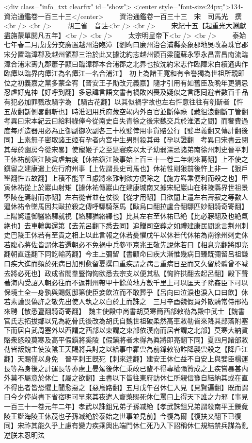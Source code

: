 <div class="info_txt clearfix" id="show">
<center style="font-size:24px;">134-資治通鑑卷一百三十三</center>
  　　資治通鑑卷一百三十三　宋　司馬光　撰<br />
<br />
　　胡三省　音註<br />
<br />
　　宋紀十五【起重光大淵獻盡旃蒙單閼凡五年】<br />
<br />
　　太宗明皇帝下<br />
<br />
　　泰始七年春二月戊戌分交廣置越州治臨漳【劉昫曰廉州治合浦縣秦象郡地吳改為珠官郡宋分置臨漳郡及越州領郡三治於此又據沈約志越州領百梁龍蘇永寧永昌富昌南流臨漳合浦宋夀九郡蕭子顯曰臨漳郡本合浦郡之北界也按沈約宋志作臨障宋白續通典作臨瘴以臨界内瘴江為名瘴江一名合浦江】　初上為諸王寛和有令譽獨為世祖所親即位之初義嘉之黨多蒙全宥【晉安王子勛改元義嘉】隨才引用有如舊臣及晩年更猜忌忍虐好鬼神【好呼到翻】多忌諱言語文書有禍敗凶喪及疑似之言應囘避者數百千品有犯必加罪戮改騧字為【騧古花翻】以其似禍字故也左右忤意往往有刳斮者【忤五故翻斮側畧翻斬也】時淮泗用兵府藏空竭内外百官並斷俸祿【藏徂浪翻斷丁管翻　考異曰宋本紀云曰給料祿俸今從南史自失青徐之後宋魏交兵於淮泗之間】而奢費過度每所造器用必為正御副御次副各三十枚嬖倖用事貨賂公行【嬖卑義翻又傳計翻後同】上素無子密取諸王姬有孕者内宫中生男則殺其母【孕以證翻　考異曰宋書云閉其母於幽房今從宋畧】使寵姬子之至是寢疾以太子幼弱深忌諸弟南徐州刺史晉平刺王休祐前鎭江陵貪虐無度【休祐鎭江陵事始上百三十一卷二年刺來葛翻】上不使之鎭留之建康遣上佐行府州事【上佐謂長史司馬也】休祐性剛狠前後忤上非一【狠戶墾翻忤五故翻】上積不能平且慮將來難制欲方便除之【施方畧乘便利而殺之也】甲寅休祐從上於巖山射雉【據休祐傳巖山在建康城南又據宋紀巖山在秣陵縣界世祖景寧陵在焉射而亦翻】左右從者並在仗後【從才用翻】日欲闇上遣左右壽寂之等數人逼休祐令墜馬因共敺拉殺之傳呼驃騎落馬【敺烏口翻拉盧合翻驃匹妙翻騎奇寄翻】上陽驚遣御醫絡驛就視【絡驛猶絡繹也】比其左右至休祐已絶【比必寐翻及也絶氣絶也】去車輪輿還第【去羌呂翻下悉去同】追贈司空葬之如禮建康民間訛言荆州刺史巴陵王休若有至貴之相上以此言報之休若憂懼戊午以休若代休祐為南徐州刺史休若腹心將佐皆謂休若還朝必不免禍中兵參軍京兆王敬先說休若曰【相息亮翻將即亮翻朝直遥翻下同訖輸芮翻】今主上彌留【書顧命曰疾大漸惟幾病日臻既彌留呂祖謙曰疾大進而頻於死病日加則愈留夏撰曰重疾謂之病言重病日至而又久留於體曾不减去將必死也】政成省閤羣豎恟恟欲悉去宗支以便其私【恟許拱翻去起呂翻】殿下聲著海内受詔入朝必往而不返荆州帶甲十餘萬地方數千里上可以匡天子除姦臣下可以保境土全一身孰與賜劒邸第使臣妾飲泣而不敢葬乎【呂向曰泣淚也淚入口曰飲】休若素謹畏偽許之敬先出使人執之以白於上而誅之　三月辛酉魏假員外散騎常侍邢祐來聘【散悉亶翻騎奇寄翻】　魏主使殿中尚書胡莫寒簡西部敕勒為殿中武士【魏書官氏志拓拔鄰以兄為紇骨氏後改為胡氏自魏世祖破柔然高車敕勒皆來降其部落附塞下而居自武周塞外以西謂之西部以東謂之東部依漠南而居者謂之北部】莫寒大納貨賂衆怒殺莫寒及高平假鎭將奚陵【假鎭將者未得為眞將即亮翻下同】夏四月諸部敕勒皆叛魏主使汝隂王天賜將兵討之以給事中羅雲為前鋒敕勒詐降襲雲殺之【降戶江翻】天賜僅以身免　晉平刺王旣死【刺來逹翻】建安王休仁益不自安上與嬖臣楊運長等為身後之計運長等亦慮上晏駕後休仁秉政已輩不得專權彌贊成之上疾嘗暴甚内外莫不屬意於休仁【屬之欲翻】主書以下皆往東府訪休仁所親信豫自結納其或在直不得出者皆恐懼上聞愈惡之【惡烏路翻】五月戊午召休仁入見【見賢遍翻】既而謂曰今夕停尚書下省宿明可早來其夜遣人齎藥賜死休仁罵曰上得天下誰之力邪【事見一百三十一卷元年二年】孝武以誅鉏兄弟子孫㓕絶【孝武誅鉏兄弟謂殺南平王鑠竟陵王誕海陵王休茂也子孫㓕絶於泰始之世事並見前】今復為爾【復扶又翻下已復同】宋祚其能久乎上慮有變力疾乘輿出端門休仁死乃入下詔稱休仁規結禁兵謀為亂逆朕未忍明法